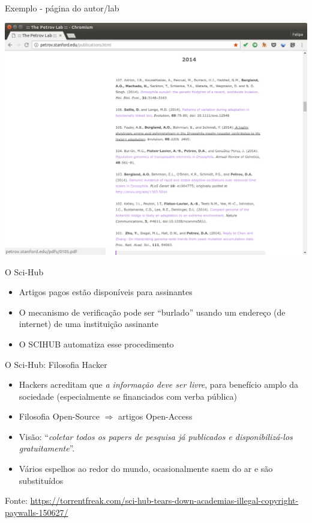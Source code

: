 \documentclass{beamer}
\begin{document}
\begin{frame}{Exemplo - página do autor/lab}
  \begin{center}
    \includegraphics[height=.9\textheight]{Busca/petrov2}
  \end{center}
\end{frame}

\begin{frame}{O Sci-Hub}
  \begin{itemize}
  \item Artigos pagos estão disponíveis para assinantes
  \item O mecanismo de verificação pode ser ``burlado'' usando um
    endereço (de internet) de uma instituição assinante
  \item O SCIHUB automatiza esse procedimento
  \end{itemize}
\end{frame}

\begin{frame}{O Sci-Hub: Filosofia Hacker}
  \begin{itemize}
  \item Hackers acreditam que {\em a informação deve ser livre}, para
    benefício amplo da sociedade (\alert{especialmente} se financiados
    com verba pública)
  \item Filosofia Open-Source $\Rightarrow$ artigos Open-Access
  \item Visão: ``{\em coletar todos os papers de pesquisa já
      publicados e disponibilizá-los gratuitamente}''.
  \item Vários espelhos ao redor do mundo, ocasionalmente saem do ar e
    são substituídos
  \end{itemize}

  Fonte: \url{https://torrentfreak.com/sci-hub-tears-down-academias-illegal-copyright-paywalls-150627/}
\end{frame}
\end{document}
